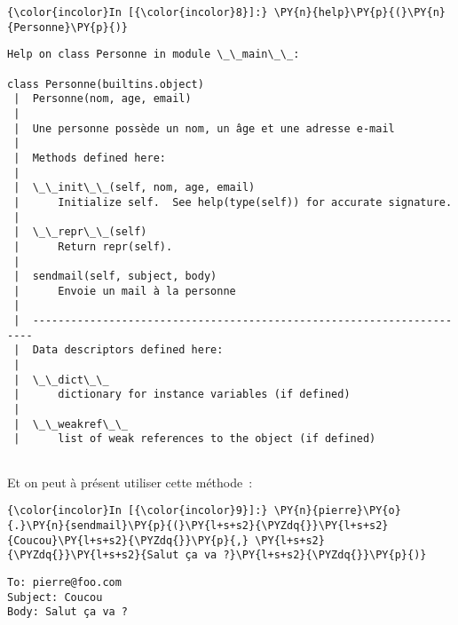     \begin{Verbatim}[commandchars=\\\{\}]
{\color{incolor}In [{\color{incolor}8}]:} \PY{n}{help}\PY{p}{(}\PY{n}{Personne}\PY{p}{)}
\end{Verbatim}


    \begin{Verbatim}[commandchars=\\\{\}]
Help on class Personne in module \_\_main\_\_:

class Personne(builtins.object)
 |  Personne(nom, age, email)
 |  
 |  Une personne possède un nom, un âge et une adresse e-mail
 |  
 |  Methods defined here:
 |  
 |  \_\_init\_\_(self, nom, age, email)
 |      Initialize self.  See help(type(self)) for accurate signature.
 |  
 |  \_\_repr\_\_(self)
 |      Return repr(self).
 |  
 |  sendmail(self, subject, body)
 |      Envoie un mail à la personne
 |  
 |  ----------------------------------------------------------------------
 |  Data descriptors defined here:
 |  
 |  \_\_dict\_\_
 |      dictionary for instance variables (if defined)
 |  
 |  \_\_weakref\_\_
 |      list of weak references to the object (if defined)


    \end{Verbatim}

    Et on peut à présent utiliser cette méthode~:

    \begin{Verbatim}[commandchars=\\\{\}]
{\color{incolor}In [{\color{incolor}9}]:} \PY{n}{pierre}\PY{o}{.}\PY{n}{sendmail}\PY{p}{(}\PY{l+s+s2}{\PYZdq{}}\PY{l+s+s2}{Coucou}\PY{l+s+s2}{\PYZdq{}}\PY{p}{,} \PY{l+s+s2}{\PYZdq{}}\PY{l+s+s2}{Salut ça va ?}\PY{l+s+s2}{\PYZdq{}}\PY{p}{)}
\end{Verbatim}


    \begin{Verbatim}[commandchars=\\\{\}]
To: pierre@foo.com
Subject: Coucou
Body: Salut ça va ?

    \end{Verbatim}


    
    
    
